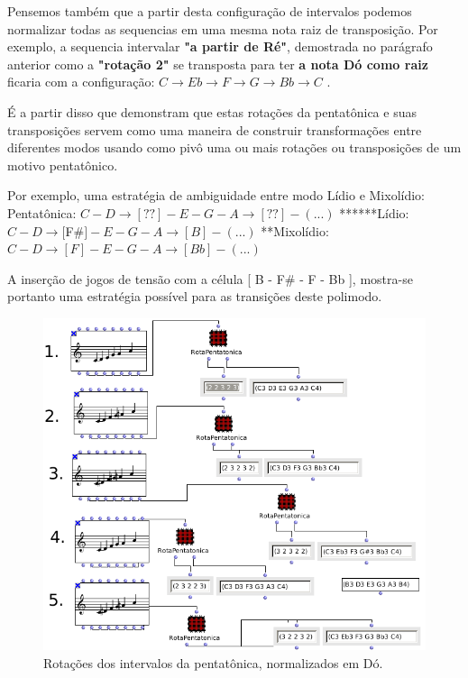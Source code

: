 \documentclass[
	12pt,				%
	openright,			%
	twoside,			%
	a4paper,			%
	english,			%
	french,				%
	spanish,			%
	brazil				%
	]{abntex2}
\begin{document}
Pensemos também que a partir desta configuração de intervalos podemos normalizar todas as sequencias em uma mesma nota raiz de transposição. Por exemplo, a sequencia intervalar \textbf{"a partir de Ré"}, demostrada no parágrafo anterior como a \textbf{"rotação 2"} se transposta para ter \textbf{a nota Dó como raiz} ficaria com a configuração: $C \rightarrow Eb \rightarrow F \rightarrow G \rightarrow Bb \rightarrow C $ .

É a partir disso que  demonstram que estas rotações da pentatônica e suas transposições servem como uma maneira de construir transformações entre diferentes modos usando como pivô uma ou mais rotações ou transposições de um motivo pentatônico. 

Por exemplo, uma estratégia de ambiguidade entre modo Lídio e Mixolídio:
\linebreak
Pentatônica: $ C - D \rightarrow [ ?? ] - E - G - A \rightarrow [ ?? ] - (...) $  \linebreak
******Lídio: $ C - D \rightarrow [ $F\#$ ] - E - G - A \rightarrow [ B ] - (...) $  \linebreak
**Mixolídio: $ C - D \rightarrow [ F ] - E - G - A \rightarrow [ Bb ] - (...) $  \linebreak

A inserção de jogos de tensão com a célula [ B - F\# - F - Bb ], mostra-se portanto uma estratégia possível para as transições deste polimodo.

\begin{figure}[!h]
	\caption{\label{fig_grafico}Rotações dos intervalos da pentatônica, normalizados em Dó. }
	\begin{center}
	    \includegraphics[scale=0.5]{OM_settheory/pentarotacoes.png}
	\end{center}
\end{figure}
\end{document}
